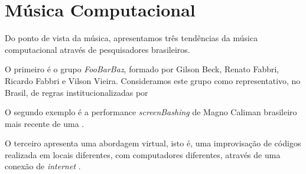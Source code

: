 
\section*{Música Computacional}

Do ponto de vista da música, apresentamos três tendências da música computacional através de pesquisadores brasileiros. 

O primeiro é o grupo \emph{FooBarBaz}, formado por Gilson Beck, Renato Fabbri, Ricardo Fabbri e Vilson Vieira. Consideramos este grupo como representativo, no Brasil, de regras institucionalizadas por 

O segundo exemplo é a performance \emph{screenBashing} de Magno Caliman brasileiro mais recente de uma \cite[p.~1, ver \protect\autoref{sec:concerto}, p.~\protect\pageref{sec:concerto}]{mclean_tidal_2010}. 

O terceiro apresenta uma abordagem virtual, isto é, uma improvisação de códigos realizada em locais diferentes, com computadores diferentes, através de uma conexão de \emph{internet} .

